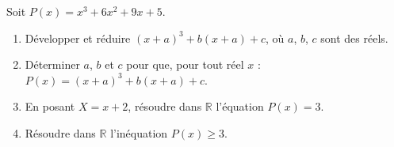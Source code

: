 
\newcommand{\R}{\mathbb{R}}
\newcommand{\vect}[1]{\overrightarrow{#1}}

Soit $P(x)=x^3+6x^2+9x+5$.
\begin{enumerate}
  \item Développer et réduire $(x+a)^3+b(x+a)+c$, où $a$, $b$, $c$ sont des réels.
  \item Déterminer $a$, $b$ et $c$ pour que, pour tout réel $x$ : $P(x)=(x+a)^3+b(x+a)+c$.
  \item En posant $X=x+2$, résoudre dans $\R$ l'équation $P(x)=3$.
  \item Résoudre dans $\R$ l'inéquation $P(x)\geq3$.
\end{enumerate}

